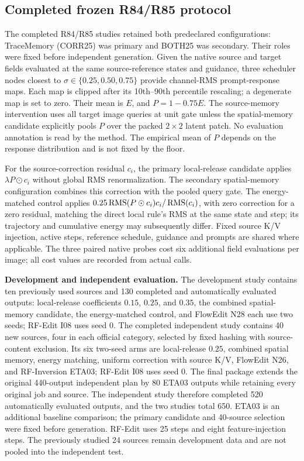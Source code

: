 \subsection{Completed frozen R84/R85 protocol}
\label{app:completed-final-protocol}
The completed R84/R85 studies retained both predeclared configurations: TraceMemory (CORR25) was primary and BOTH25 was secondary. Their roles were fixed before independent generation. Given the native source and target fields evaluated at the same source-reference states and guidance, three scheduler nodes closest to $\sigma\in\{0.25,0.50,0.75\}$ provide channel-RMS prompt-response maps. Each map is clipped after its 10th--90th percentile rescaling; a degenerate map is set to zero. Their mean is $E$, and $P=1-0.75E$. The source-memory intervention uses all target image queries at unit gate unless the spatial-memory candidate explicitly pools $P$ over the packed $2\times2$ latent patch. No evaluation annotation is read by the method. The empirical mean of $P$ depends on the response distribution and is not fixed by the floor.

For the source-correction residual $c_i$, the primary local-release candidate applies $\lambda P\odot c_i$ without global RMS renormalization. The secondary spatial-memory configuration combines this correction with the pooled query gate. The energy-matched control applies $0.25\operatorname{RMS}(P\odot c_i)c_i/\operatorname{RMS}(c_i)$, with zero correction for a zero residual, matching the direct local rule's RMS at the same state and step; its trajectory and cumulative energy may subsequently differ. Fixed source K/V injection, active steps, reference schedule, guidance and prompts are shared where applicable. The three paired native probes cost six additional field evaluations per image; all cost values are recorded from actual calls.

\noindent\textbf{Development and independent evaluation.}
The development study contains ten previously used sources and 130 completed and automatically evaluated outputs: local-release coefficients $0.15$, $0.25$, and $0.35$, the combined spatial-memory candidate, the energy-matched control, and FlowEdit N28 each use two seeds; RF-Edit I08 uses seed 0. The completed independent study contains 40 new sources, four in each official category, selected by fixed hashing with source-content exclusion. Its six two-seed arms are local-release $0.25$, combined spatial memory, energy matching, uniform correction with source K/V, FlowEdit N26, and RF-Inversion ETA03; RF-Edit I08 uses seed 0. The final package extends the original 440-output independent plan by 80 ETA03 outputs while retaining every original job and source. The independent study therefore completed 520 automatically evaluated outputs, and the two studies total 650. ETA03 is an additional baseline comparison; the primary candidate and 40-source selection were fixed before generation. RF-Edit uses 25 steps and eight feature-injection steps. The previously studied 24 sources remain development data and are not pooled into the independent test.

